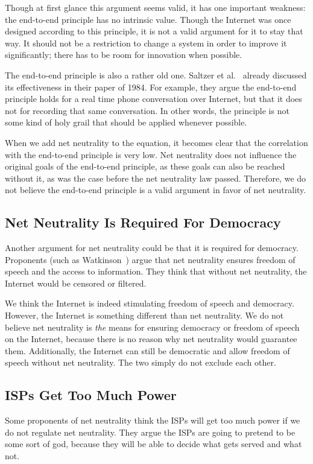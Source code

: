 Though at first glance this argument seems valid, it has one important weakness: the end-to-end principle has no intrinsic value. Though the Internet was once designed according to this principle, it is not a valid argument for it to stay that way.
It should not be a restriction to change a system in order to improve it significantly; there has to be room for innovation when possible.

The end-to-end principle is also a rather old one.
Saltzer et al.~\cite{saltzer1984end} already discussed its effectiveness in their paper of 1984.
For example, they argue the end-to-end principle holds for a real time phone conversation over Internet, but that it does not for recording that same conversation.
In other words, the principle is not some kind of holy grail that should be applied whenever possible.

When we add net neutrality to the equation, it becomes clear that the correlation with the end-to-end principle is very low.
Net neutrality does not influence the original goals of the end-to-end principle, as these goals can also be reached without it, as was the case before the net neutrality law passed.
Therefore, we do not believe the end-to-end principle is a valid argument in favor of net neutrality.

\subsection{Net Neutrality Is Required For Democracy}
Another argument for net neutrality could be that it is required for democracy.
Proponents (such as Watkinson~\cite{watkinson2012democracy}) argue that net neutrality ensures freedom of speech and the access to information.
They think that without net neutrality, the Internet would be censored or filtered.

We think the Internet is indeed stimulating freedom of speech and democracy.
However, the Internet is something different than net neutrality.
We do not believe net neutrality is \emph{the} means for ensuring democracy or freedom of speech on the Internet, because there is no reason why net neutrality would guarantee them.
Additionally, the Internet can still be democratic and allow freedom of speech without net neutrality.
The two simply do not exclude each other.

\subsection{\acp{ISP} Get Too Much Power}
Some proponents of net neutrality think the \acp{ISP} will get too much power if we do not regulate net neutrality.
They argue the \acp{ISP} are going to pretend to be some sort of god, because they will be able to decide what gets served and what not. %

